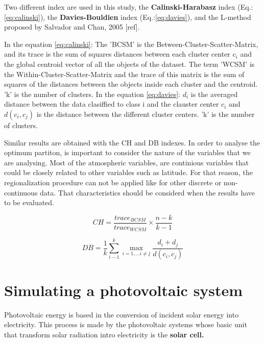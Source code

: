 Two different index are used in this study, the \textbf{Calinski-Harabasz} index (Eq.:\ref{eq:calinski}), the \textbf{Davies-Bouldien} index (Eq.:\ref{eq:davies}), and the L-method proposed by Salvador and Chan, 2005 [ref].

In the equation \ref{eq:calinski}: The 'BCSM' is the Between-Cluster-Scatter-Matrix, and its trace is the sum of squares distances between each cluster center $c_{i}$ and the global centroid vector of all the objects of the dataset. The term 'WCSM' is the Within-Cluster-Scatter-Matrix and the trace of this matrix is the sum of squares of the distances between the objects inside each cluster and the centroid. 'k' is the number of clusters. In the equation \ref{eq:davies}: $d_{i}$ is the averaged distance between the data clasiffied to class i and the clauster center $c_{i}$ and $d(c_i,c_j)$ is the distance between the different cluster centers. 'k' is the number of clusters. 

Similar results are obtained with the CH and DB indexes. In order to analyse the optimum partiton, is important to consider the nature of the variables that we are analysing. Most of the atmospheric variables, are continious variables that could be closely related to other variables such as latitude. For that reason, the regionalization procedure can not be applied like for other discrete or non-continuous data. That characteristics should be considerd when the results have to be evaluated.

\begin{equation}\label{eq:calinski}
    CH =\frac{trace_{BCSM}}{trace_{WCSM}}\times\frac{n-k}{k-1}
\end{equation}

\begin{equation}\label{eq:davies}
    DB =\frac{1}{k}\sum_{i-1}^{k}\max_{i=1,...i\neq{j}}{\frac{d_{i}+d_{j}}{d(c_i,c_j)}}
\end{equation}

\section{Simulating a photovoltaic system}

Photovoltaic energy is based in the conversion of incident solar energy into electricity. This process is made by the photovoltaic systems whose basic unit that transform solar radiation intro electricity is the \textbf{solar cell.}\\

